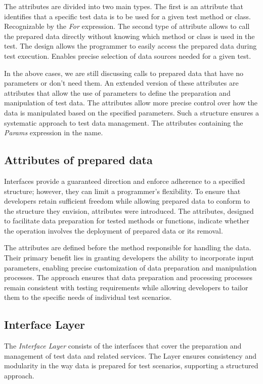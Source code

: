 The attributes are divided into two main types. The first is an attribute that identifies that a specific test data is to be used for a given test method or class. Recognizable by the \textit{For} expression. The second type of attribute allows to call the prepared data directly without knowing which method or class is used in the test. The design allows the programmer to easily access the prepared data during test execution. Enables precise selection of data sources needed for a given test.

In the above cases, we are still discussing calls to prepared data that have no parameters or don't need them. An extended version of these attributes are attributes that allow the use of parameters to define the preparation and manipulation of test data. The attributes allow more precise control over how the data is manipulated based on the specified parameters.  Such a structure ensures a systematic approach to test data management. The attributes containing the \textit{Params} expression in the name.

\subsection*{Attributes of prepared data}

Interfaces provide a guaranteed direction and enforce adherence to a specified structure; however, they can limit a programmer’s flexibility. To ensure that developers retain sufficient freedom while allowing prepared data to conform to the structure they envision, attributes were introduced. The attributes, designed to facilitate data preparation for tested methods or functions, indicate whether the operation involves the deployment of prepared data or its removal.

The attributes are defined before the method responsible for handling the data. Their primary benefit lies in granting developers the ability to incorporate input parameters, enabling precise customization of data preparation and manipulation processes.
The approach ensures that data preparation and processing processes remain consistent with testing requirements while allowing developers to tailor them to the specific needs of individual test scenarios.

\subsection{Interface Layer}
The \textit{Interface Layer} consists of the interfaces that cover the preparation and management of test data and related services. The Layer ensures consistency and modularity in the way data is prepared for test scenarios, supporting a structured approach.

